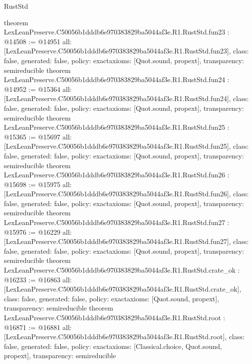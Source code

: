 \begin{lexlean}{RustStd}
\begin{coremodule}
{}
theorem LexLeanPreserve.C50056b1dddb6e970383829ba5044af3e.R1.RustStd.fun23 : @14508 := @14951 {
  all: [LexLeanPreserve.C50056b1dddb6e970383829ba5044af3e.R1.RustStd.fun23],
  class: false,
  generated: false,
  policy: exact{axioms: [Quot.sound, propext]},
  transparency: semireducible
}
theorem LexLeanPreserve.C50056b1dddb6e970383829ba5044af3e.R1.RustStd.fun24 : @14952 := @15364 {
  all: [LexLeanPreserve.C50056b1dddb6e970383829ba5044af3e.R1.RustStd.fun24],
  class: false,
  generated: false,
  policy: exact{axioms: [Quot.sound, propext]},
  transparency: semireducible
}
theorem LexLeanPreserve.C50056b1dddb6e970383829ba5044af3e.R1.RustStd.fun25 : @15365 := @15697 {
  all: [LexLeanPreserve.C50056b1dddb6e970383829ba5044af3e.R1.RustStd.fun25],
  class: false,
  generated: false,
  policy: exact{axioms: [Quot.sound, propext]},
  transparency: semireducible
}
theorem LexLeanPreserve.C50056b1dddb6e970383829ba5044af3e.R1.RustStd.fun26 : @15698 := @15975 {
  all: [LexLeanPreserve.C50056b1dddb6e970383829ba5044af3e.R1.RustStd.fun26],
  class: false,
  generated: false,
  policy: exact{axioms: [Quot.sound, propext]},
  transparency: semireducible
}
theorem LexLeanPreserve.C50056b1dddb6e970383829ba5044af3e.R1.RustStd.fun27 : @15976 := @16229 {
  all: [LexLeanPreserve.C50056b1dddb6e970383829ba5044af3e.R1.RustStd.fun27],
  class: false,
  generated: false,
  policy: exact{axioms: [Quot.sound, propext]},
  transparency: semireducible
}
theorem LexLeanPreserve.C50056b1dddb6e970383829ba5044af3e.R1.RustStd.crate_ok : @16233 := @16863 {
  all: [LexLeanPreserve.C50056b1dddb6e970383829ba5044af3e.R1.RustStd.crate_ok],
  class: false,
  generated: false,
  policy: exact{axioms: [Quot.sound, propext]},
  transparency: semireducible
}
theorem LexLeanPreserve.C50056b1dddb6e970383829ba5044af3e.R1.RustStd.root : @16871 := @16881 {
  all: [LexLeanPreserve.C50056b1dddb6e970383829ba5044af3e.R1.RustStd.root],
  class: false,
  generated: false,
  policy: exact{axioms: [Classical.choice, Quot.sound, propext]},
  transparency: semireducible
}


\end{coremodule}
\end{lexlean}
